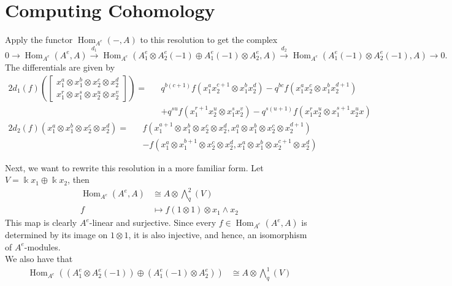 \documentclass[12pt,a4paper]{article}
\DeclareMathOperator{\Hom}{Hom}
\newcommand{\Wedge}{\textstyle\bigwedge}
\newcommand{\kk}{\Bbbk}
\newcommand\1{_{(1)}}
\newcommand\2{_{(2)}}
\begin{document}
\newpage

\section{Computing Cohomology}
Apply the functor $\Hom_{A^e}(-,A)$ to this resolution to get the complex
\[
0\to \Hom_{A^e}(A^e,A)\xrightarrow{d_1} \Hom_{A^e}(A_1^e\otimes A_2^e(-1)\oplus A_1^e(-1)\otimes A_2^e,A)\xrightarrow{d_2}\Hom_{A^e}(A_1^e(-1)\otimes A_2^e(-1),A)\to 0.  
\]
The differentials are given by
\begin{alignat*}{2}
  d_1(f)\left(\begin{bmatrix}x_1^a\otimes x_1^b\otimes x_2^c\otimes x_2^d\\ x_1^r\otimes x_1^s\otimes x_2^u\otimes x_2^v\end{bmatrix}\right)= &&q^{b(c+1)}f(x_1^ax_2^{c+1}\otimes x_1^bx_2^d)-q^{bc}f(x_1^ax_2^c\otimes x_1^bx_2^{d+1})\\
  && +q^{su}f(x_1^{r+1}x_2^u\otimes x_1^sx_2^v)-q^{s(u+1)}f(x_1^rx_2^u\otimes x_1^{s+1}x_2^ux)
\end{alignat*}  
\begin{alignat*}{2}
  d_2(f)(x_1^a\otimes x_1^b\otimes x_2^c\otimes x_2^d)=&&f(x_1^{a+1}\otimes x_1^b\otimes x_2^c\otimes x_2^d,x_1^a\otimes x_1^b\otimes x_2^c\otimes x_2^{d+1})\\
  &&-f(x_1^a\otimes x_1^{b+1}\otimes x_2^c\otimes x_2^d,x_1^a\otimes x_1^b\otimes x_2^{c+1}\otimes x_2^d)
\end{alignat*}

Next, we want to rewrite this resolution in a more familiar form.
Let $V=\kk x_1\oplus \kk x_2$, then
\begin{align*}
\Hom_{A^e}(A^e,A)&\cong A\otimes \Wedge^2_q (V)\\
f&\mapsto f(1\otimes 1)\otimes x_1\wedge x_2
\end{align*}
This map is clearly $A^e$-linear and surjective.
Since every $f\in \Hom_{A^e}(A^e,A)$ is determined by its image on $1\otimes 1$, it is also injective, and hence, an isomorphism of $A^e$-modules.
\\

We also have that
\begin{align*}
\Hom_{A^e}(\left(A_1^e\otimes A_2^e(-1)\right)\oplus\left(A_1^e(-1)\otimes A_2^e\right))&\cong A\otimes \Wedge_q^1(V)
\end{align*}
\end{document}

